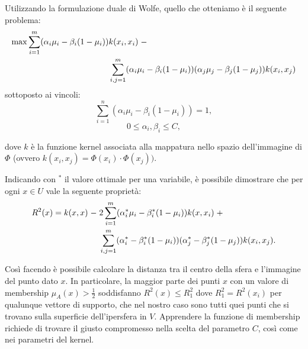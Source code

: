 \documentclass[a4paper,12pt]{report}
\begin{document}
Utilizzando la formulazione duale di Wolfe, quello che otteniamo è il seguente problema:
\begin{equation}
\begin{split}
    \max \displaystyle\sum_{i=1}^{m}(\alpha_i\mu_i - \beta_i(1-\mu_i))&k(x_i,x_i)\hspace{0,1cm}- \\ &\displaystyle\sum_{i,j=1}^{m}(\alpha_i\mu_i - \beta_i(1-\mu_i))(\alpha_j\mu_j - \beta_j(1-\mu_j))k(x_i,x_j)
\end{split}
\label{eq:problema_finale}
\end{equation}
sottoposto ai vincoli:
\begin{equation}
    \displaystyle\sum_{i=1}^{n}(\alpha_i\mu_i - \beta_i(1-\mu_i)) = 1,
    \label{eq:v1_problema_finale}
\end{equation}
\begin{equation}
    0 \le \alpha_i,\beta_i \le C,
    \label{eq:v2_problema_finale}
\end{equation}

\noindent dove $k$ è la funzione kernel associata alla mappatura nello spazio dell'immagine di $\Phi$ (ovvero $k(x_i,x_j) = \Phi(x_i)\cdot\Phi(x_j))$.

Indicando con $^*$ il valore ottimale per una variabile, è possibile dimostrare che per ogni $x \in U$ vale la seguente proprietà:
\begin{equation*}
\begin{split}
    R^{2}(x) = k(x,x) \hspace{0,1cm}- \hspace{0,1cm}&2\displaystyle\sum_{i=1}^{m}(\alpha_{i}^{*}\mu_{i} - \beta_{i}^{*}(1-\mu_{i}))k(x,x_i)\hspace{0,1cm} + \\ 
    &\displaystyle\sum_{i,j=1}^{m}(\alpha_{i}^{*} - \beta_{i}^{*}(1-\mu_{i}))(\alpha_{j}^{*} - \beta_{j}^{*}(1-\mu_{j}))k(x_i,x_j).
\end{split}
\end{equation*}

\noindent Così facendo è possibile calcolare la distanza tra il centro della sfera e l'immagine del punto dato $x$.
In particolare, la maggior parte dei punti $x$ con un valore di membership $\mu_{A}(x) > \frac{1}{2}$ soddisfanno $R^2(x) \le R^2_1$ dove $R^2_1 = R^2(x_i)$ per qualunque vettore di supporto, che nel nostro caso sono tutti quei punti che si trovano sulla superficie dell'ipersfera in $V$.
Apprendere la funzione di membership richiede di trovare il giusto compromesso nella scelta del parametro $C$, così come nei parametri del kernel.
\end{document}
